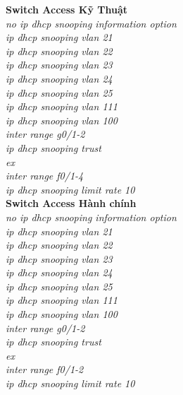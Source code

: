 \documentclass[a4paper, 12pt]{article}
\begin{document}
\hspace*{1cm}\textbf{Switch Access Kỹ Thuật}\\
\hspace*{2cm}\textit{no ip dhcp snooping information option\\
\hspace*{2cm}ip dhcp snooping vlan 21\\
\hspace*{2cm}ip dhcp snooping vlan 22\\
\hspace*{2cm}ip dhcp snooping vlan 23\\
\hspace*{2cm}ip dhcp snooping vlan 24\\
\hspace*{2cm}ip dhcp snooping vlan 25\\
\hspace*{2cm}ip dhcp snooping vlan 111\\
\hspace*{2cm}ip dhcp snooping vlan 100\\
\hspace*{2cm}inter range g0/1-2\\
\hspace*{2cm}ip dhcp snooping trust\\
\hspace*{2cm}ex\\
\hspace*{2cm}inter range f0/1-4\\
\hspace*{2cm}ip dhcp snooping limit rate 10\\}
\hspace*{1cm}\textbf{Switch Access Hành chính}\\
\hspace*{2cm}\textit{no ip dhcp snooping information option\\
\hspace*{2cm}ip dhcp snooping vlan 21\\
\hspace*{2cm}ip dhcp snooping vlan 22\\
\hspace*{2cm}ip dhcp snooping vlan 23\\
\hspace*{2cm}ip dhcp snooping vlan 24\\
\hspace*{2cm}ip dhcp snooping vlan 25\\
\hspace*{2cm}ip dhcp snooping vlan 111\\
\hspace*{2cm}ip dhcp snooping vlan 100\\
\hspace*{2cm}inter range g0/1-2\\
\hspace*{2cm}ip dhcp snooping trust\\
\hspace*{2cm}ex\\
\hspace*{2cm}inter range f0/1-2\\
\hspace*{2cm}ip dhcp snooping limit rate 10\\}
\end{document}
